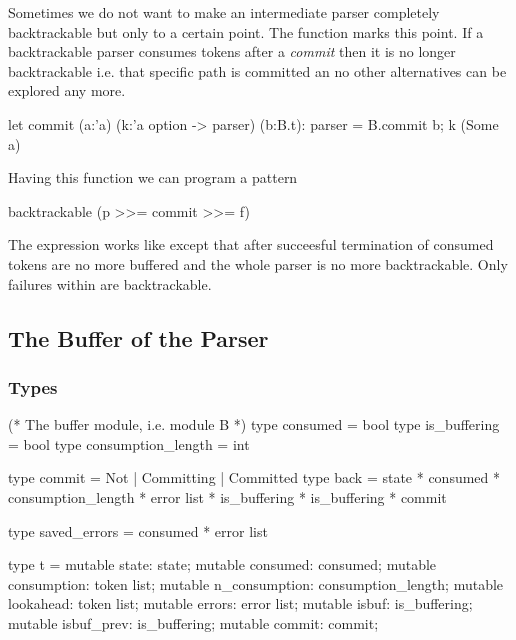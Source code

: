 Sometimes we do not want to make an intermediate parser completely
backtrackable but only to a certain point. The function  marks
this point. If a backtrackable parser consumes tokens after a \emph{commit}
then it is no longer backtrackable i.e. that specific path is committed an no
other alternatives can be explored any more.
%
\begin{ocaml}
  let commit (a:'a) (k:'a option -> parser) (b:B.t): parser =
    B.commit b;
    k (Some a)
\end{ocaml}
%
Having this function we can program a pattern
%
\begin{ocaml}
  backtrackable (p >>= commit >>= f)
\end{ocaml}
%
The expression  works like  except that
after succeesful termination of  consumed tokens are no more buffered
and the whole parser is no more backtrackable. Only failures within 
are backtrackable.







\subsection{The Buffer of the Parser}


\subsubsection{Types}

\begin{ocaml}
  (* The buffer module, i.e. module B *)
  type consumed     = bool
  type is_buffering = bool
  type consumption_length = int

  type commit = Not | Committing | Committed
  type back = state * consumed * consumption_length
              * error list
              * is_buffering * is_buffering  * commit

  type saved_errors = consumed * error list

  type t = {mutable state: state;
            mutable consumed:      consumed;
            mutable consumption:   token list;
            mutable n_consumption: consumption_length;
            mutable lookahead:     token list;
            mutable errors:        error list;
            mutable isbuf:         is_buffering;
            mutable isbuf_prev:    is_buffering;
            mutable commit:        commit;
           }
\end{ocaml}



